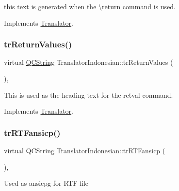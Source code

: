 this text is generated when the \textbackslash{}return command is used. 

Implements \mbox{\hyperlink{class_translator}{Translator}}.

\mbox{\label{class_translator_indonesian_a3f15b9d74f5e720309a09ffe1fb163d8}} 
\subsubsection{\texorpdfstring{trReturnValues()}{trReturnValues()}}
{\footnotesize\ttfamily virtual \mbox{\hyperlink{class_q_c_string}{Q\+C\+String}} Translator\+Indonesian\+::tr\+Return\+Values (\begin{DoxyParamCaption}{ }\end{DoxyParamCaption})\hspace{0.3cm}{\ttfamily [inline]}, {\ttfamily [virtual]}}

This is used as the heading text for the retval command. 

Implements \mbox{\hyperlink{class_translator}{Translator}}.

\mbox{\label{class_translator_indonesian_a7fe8b62fd5171fc48bd92af2766a74ee}} 
\subsubsection{\texorpdfstring{trRTFansicp()}{trRTFansicp()}}
{\footnotesize\ttfamily virtual \mbox{\hyperlink{class_q_c_string}{Q\+C\+String}} Translator\+Indonesian\+::tr\+R\+T\+Fansicp (\begin{DoxyParamCaption}{ }\end{DoxyParamCaption})\hspace{0.3cm}{\ttfamily [inline]}, {\ttfamily [virtual]}}

Used as ansicpg for R\+TF file

